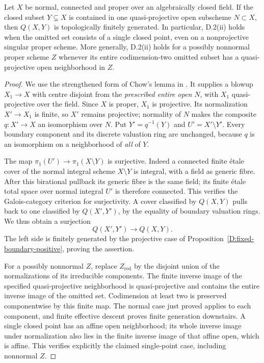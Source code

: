 \begin{proposition}
\label{D:boundary-neighborhood}
Let $X$ be normal, connected and proper over an algebraically closed
field. If the closed subset $Y\subsetneq X$ is contained in one
quasi-projective open subscheme $N\subset X$, then $Q(X,Y)$ is
topologically finitely generated. In particular, D.2(ii) holds when
the omitted set consists of a single closed point, even on a
nonprojective singular proper scheme. More generally, D.2(ii) holds
for a possibly nonnormal proper scheme $Z$ whenever its entire
codimension-two omitted subset has a quasi-projective open
neighborhood in $Z$.
\end{proposition}
\begin{proof}
We use the strengthened form of Chow's lemma in
\cite[Chapter 4, section 4, Proposition 5, p.~30]{Raynaud1972D}.
It supplies a blowup $X_1\to X$ with centre disjoint from the
\emph{prescribed entire open} $N$, with $X_1$ quasi-projective
over the field. Since $X$ is proper, $X_1$ is projective. Its
normalization $X'\to X_1$ is finite, so $X'$ remains projective;
normality of $N$ makes the composite $q:X'\to X$ an isomorphism
over $N$. Put $Y'=q^{-1}(Y)$ and $U'=X'\setminus Y'$.
Every boundary component and its discrete valuation ring are
unchanged, because $q$ is an isomorphism on a neighborhood of
\emph{all} of $Y$.

The map $\pi_1(U')\to\pi_1(X\setminus Y)$ is surjective.
Indeed a connected finite \'etale cover of the normal integral
scheme $X\setminus Y$ is integral, with a field as generic fibre.
After this birational pullback its generic fibre is the same field;
its finite \'etale total space over normal integral $U'$ is therefore
connected. This verifies the Galois-category criterion for surjectivity.
A cover classified by $Q(X,Y)$ pulls back to one classified by
$Q(X',Y')$, by the equality of boundary valuation rings. We thus
obtain a surjection
\[
 Q(X',Y')\longrightarrow Q(X,Y).
\]
The left side is finitely generated by the projective case of
Proposition~\ref{D:fixed-boundary-positive}, proving the assertion.

For a possibly nonnormal $Z$, replace $Z_{\mathrm{red}}$ by the
disjoint union of the normalizations of its irreducible components.
The finite inverse image of the specified quasi-projective
neighborhood is quasi-projective and contains the entire inverse
image of the omitted set. Codimension at least two is preserved
componentwise by this finite map. The normal case just proved applies
to each component, and finite effective descent
\cite[IX, Corollary 5.2, pp.~247--248]{SGA1} proves finite generation
downstairs. A single closed point has an affine open neighborhood;
its whole inverse image under normalization also lies in the finite
inverse image of that affine open, which is affine. This verifies
explicitly the claimed single-point case, including nonnormal $Z$.
\end{proof}



